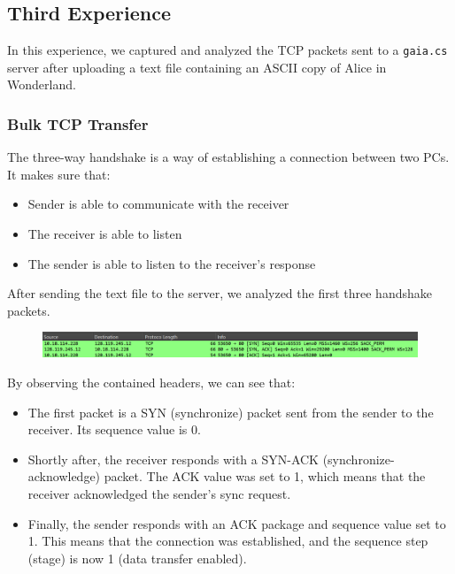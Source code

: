 \subsection{Third Experience}

In this experience, we captured and analyzed the TCP packets sent to a
\texttt{gaia.cs} server after uploading a text file containing an ASCII copy of
Alice in Wonderland.

\subsubsection{Bulk TCP Transfer}

The three-way handshake is a way of establishing a connection between two PCs.
It makes sure that:

\begin{itemize}
	\item Sender is able to communicate with the receiver
	\item The receiver is able to listen
	\item The sender is able to listen to the receiver's response
\end{itemize}

After sending the text file to the server, we analyzed the first three
handshake packets.

\begin{figure}[htbp]
	\centering
	\includegraphics[width=1\linewidth]{img/third_experience/1.png}
	\caption{}\label{fig:3_1}
\end{figure}

By observing the contained headers, we can see that:

\begin{itemize}
	\item The first packet is a SYN (synchronize) packet sent from the sender to the
	      receiver. Its sequence value is 0.
	\item Shortly after, the receiver responds with a SYN-ACK (synchronize-acknowledge)
	      packet. The ACK value was set to 1, which means that the receiver acknowledged
	      the sender's sync request.
	\item Finally, the sender responds with an ACK package and sequence value set to 1.
	      This means that the connection was established, and the sequence step (stage)
	      is now 1 (data transfer enabled).
\end{itemize}

